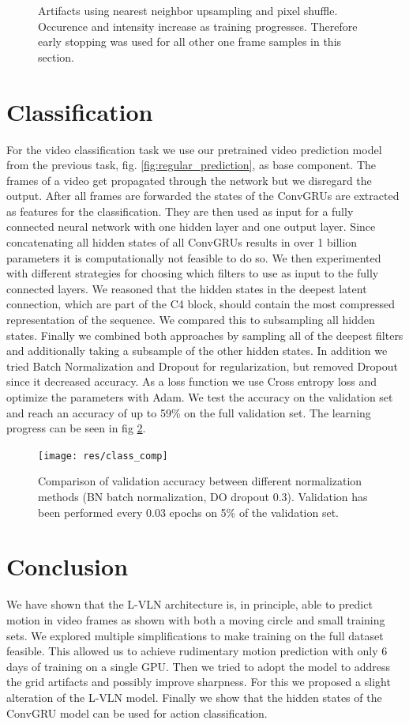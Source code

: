 \documentclass[runningheads,a4paper]{llncs}
\begin{document}
\begin{figure}[!tbp]
  \caption{ Artifacts using nearest neighbor upsampling and pixel shuffle. Occurence and intensity increase as training progresses. Therefore early stopping was used for all other one frame samples in this section. }
  \label{fig:artifacts}
\end{figure}


\section{Classification}
For the video classification task we use our pretrained video prediction model from the previous task, fig. \ref{fig:regular_prediction}, as base component. The frames of a video get propagated through the network but we disregard the output. After all frames are forwarded the states of the ConvGRUs are extracted as features for the classification.
They are then used as input for a fully connected neural network with one hidden layer and one output layer. Since concatenating all hidden states of all ConvGRUs results in over 1 billion parameters it is computationally not feasible to do so. We then experimented with different strategies for choosing which filters to use as input to the fully connected layers. We reasoned that the hidden states in the deepest latent connection, which are part of the C4 block, should contain the most compressed representation of the sequence. We compared this to subsampling all hidden states. Finally we combined both approaches by sampling all of the deepest filters and additionally taking a subsample of the other hidden states. In addition we tried Batch Normalization and Dropout for regularization, but removed Dropout since it decreased accuracy. As a loss function we use Cross entropy loss and optimize the parameters with Adam. We test the accuracy on the validation set and reach an accuracy of up to 59\% on the full validation set. The learning progress can be seen in fig \ref{fig:class_comp}.

\begin{figure}
\texttt{[image: res/class\_comp]}
\caption{ Comparison of validation accuracy between different normalization methods (BN batch normalization, DO dropout 0.3). Validation has been performed every 0.03 epochs on 5\% of the validation set. }
\label{fig:class_comp}
\end{figure}
 

\section{Conclusion}
We have shown that the L-VLN architecture is, in principle, able to predict motion in video frames as shown with both a moving circle and small training sets. We explored multiple simplifications to make training on the full dataset feasible. This allowed us to achieve rudimentary motion prediction with only 6 days of training on a single GPU. Then we tried to adopt the model to address the grid artifacts and possibly improve sharpness. For this we proposed a slight alteration of the L-VLN model. Finally we show that the hidden states of the ConvGRU model can be used for action classification.
\end{document}
